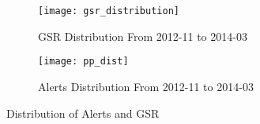 %
\begin{figure*}
\centering
\begin{subfigure}{\columnwidth}
  \centering
  \texttt{[image: gsr\_distribution]}
  \caption{GSR Distribution From 2012-11 to 2014-03}
  \label{fig:gsrdistribution}
\end{subfigure}%
\begin{subfigure}{\columnwidth}
  \centering
  \texttt{[image: pp\_dist]}
  \caption{Alerts Distribution From 2012-11 to 2014-03}
  \label{fig:ppdistribution}
\end{subfigure}
\caption{Distribution of Alerts and GSR}
\label{fig:distribution}
\end{figure*}

